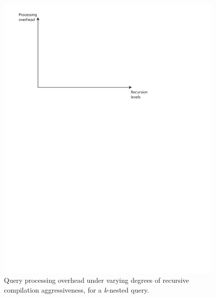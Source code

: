 \documentclass{sig-alternate}
\begin{document}
\begin{figure}
\includegraphics[scale=0.6]{figures/axes-rlevels.pdf}
\caption{Query processing overhead under varying degrees of recursive
compilation aggressiveness, for a \textit{k}-nested query.}
\label{fig:overhead-recursion-levels-nesting}
\end{figure}
\end{document}
